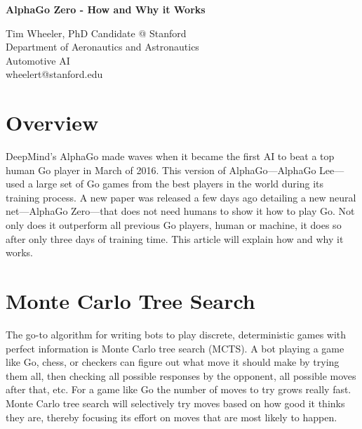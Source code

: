 \documentclass[10pt]{article}
\begin{document}
{\LARGE \bf AlphaGo Zero - How and Why it Works}

\vspace{2mm}

Tim Wheeler, PhD Candidate @ Stanford \\
Department of Aeronautics and Astronautics \\
Automotive AI \\
wheelert@stanford.edu \\[1em]

\section*{Overview}

DeepMind's AlphaGo made waves when it became the first AI to beat a top human Go player in March of 2016.
This version of AlphaGo---AlphaGo Lee---used a large set of Go games from the best players in the world during its training process. A new paper was released a few days ago detailing a new neural net---AlphaGo Zero---that does not need humans to show it how to play Go. Not only does it outperform all previous Go players, human or machine, it does so after only three days of training time. This article will explain how and why it works.


\section*{Monte Carlo Tree Search}

The go-to algorithm for writing bots to play discrete, deterministic games with perfect information is Monte Carlo tree search (MCTS).
A bot playing a game like Go, chess, or checkers can figure out what move it should make by trying them all, then checking all possible responses by the opponent, all possible moves after that, etc.
For a game like Go the number of moves to try grows really fast.
Monte Carlo tree search will selectively try moves based on how good it thinks they are, thereby focusing its effort on moves that are most likely to happen.
\end{document}
